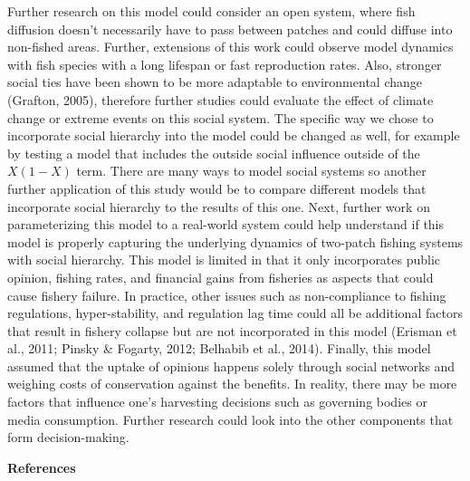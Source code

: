 \documentclass[
  12pt,
]{article}
\begin{document}
Further research on this model could consider an open system, where fish diffusion doesn't necessarily have to pass between patches and could diffuse into non-fished areas. Further, extensions of this work could observe model dynamics with fish species with a long lifespan or fast reproduction rates. Also, stronger social ties have been shown to be more adaptable to environmental change (Grafton, 2005), therefore further studies could evaluate the effect of climate change or extreme events on this social system. The specific way we chose to incorporate social hierarchy into the model could be changed as well, for example by testing a model that includes the outside social influence outside of the \(X(1-X)\) term. There are many ways to model social systems so another further application of this study would be to compare different models that incorporate social hierarchy to the results of this one. Next, further work on parameterizing this model to a real-world system could help understand if this model is properly capturing the underlying dynamics of two-patch fishing systems with social hierarchy. This model is limited in that it only incorporates public opinion, fishing rates, and financial gains from fisheries as aspects that could cause fishery failure. In practice, other issues such as non-compliance to fishing regulations, hyper-stability, and regulation lag time could all be additional factors that result in fishery collapse but are not incorporated in this model (Erisman et al., 2011; Pinsky \& Fogarty, 2012; Belhabib et al., 2014). Finally, this model assumed that the uptake of opinions happens solely through social networks and weighing costs of conservation against the benefits. In reality, there may be more factors that influence one's harvesting decisions such as governing bodies or media consumption. Further research could look into the other components that form decision-making.

\newpage

\textbf{References}
\end{document}
